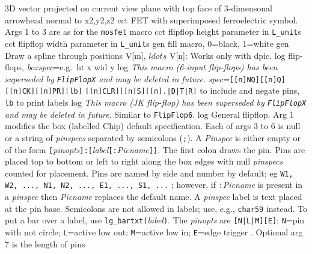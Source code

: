   {3D}
  {vector projected on current view plane with top face
   of 3-dimensonal arrowhead normal to x2,y2,z2 }
  {cct}
  {FET with superimposed ferroelectric symbol. Args 1 to 3 are as for
   the {\tt mosfet} macro
    }
  {cct}
  {flipflop height parameter in {\tt L\_unit}s}
  {cct}
  {flipflop width parameter in {\tt L\_unit}s}
  {gen}
  {fill macro, 0=black, 1=white}
  {gen}
  {Draw a spline through positions V[m], $ldots$ V[n]: Works only with dpic.}
  {log}
  {flip-flops,
  {\sl boxspec}=e.g.\ ht x wid y }
  {log}
  {{\em This macro (6-input flip-flops)
    has been superseded by {\tt FlipFlopX} and may be deleted
    in future}.
    {\sl spec}={\tt [[n]NQ][[n]Q][[n]CK][[n]PR][lb]}
    {\tt [[n]CLR][[n]S][[n].|D|T|R]} to include and negate pins,
    {\tt lb} to print labels }
  {log}
  {{\em This macro (JK flip-flop)
    has been superseded by {\tt FlipFlopX} and may be deleted
    in future}.
   Similar to {\tt FlipFlop6}.}
  {log}
  {General flipflop.
   Arg 1 modifies the box (labelled Chip) default specification.
   Each of args 3 to 6 is null or a string of {\sl pinspecs}
   separated by semicolons ({\tt;}).  A {\sl Pinspec} is either empty
   or of the form
   {\tt[}{\sl pinopts}{\tt]:[}{\sl label}{\tt[:}{\sl Picname}{\tt]]}.
   The first colon draws the pin.
   Pins are placed top to bottom or left to right along the box edges with
   null {\sl pinspecs} counted for placement. Pins are named by side and number
   by default; eg {\tt W1, W2, ..., N1, N2, ..., E1, ..., S1, ...} ; however,
   if {\tt:}{\sl Picname} is present in a {\sl pinspec} then {\sl Picname}
   replaces the default name.
   A {\sl pinspec} label is text placed at the pin base. Semicolons are
   not allowed in labels; use, e.g., {\tt {}char59}
   instead.
   To put a bar over a label, use {\tt lg\_bartxt(}{\sl label}{\tt)}.
   The {\sl pinopts} are {\tt[N|L|M][E]};
 {\tt N}=pin with not circle;
 {\tt L}=active low out; {\tt M}=active low in;
 {\tt E}=edge trigger . Optional arg 7 is the length
 of pins}
